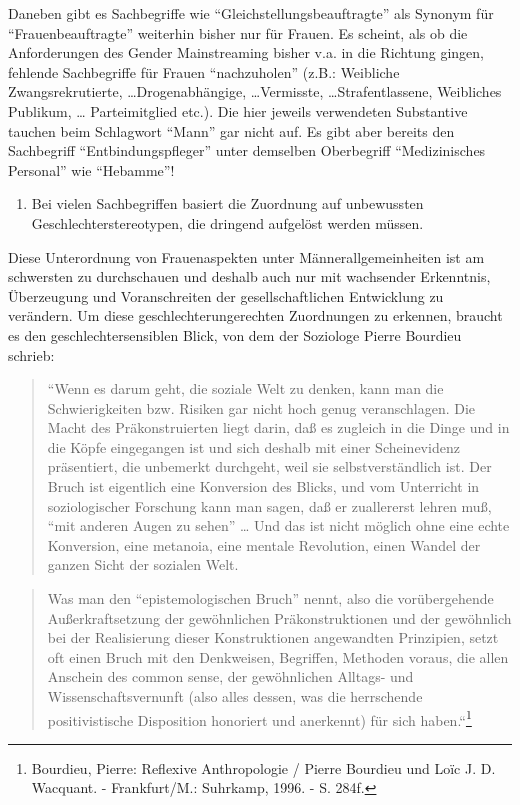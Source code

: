\documentclass[a4paper,
fontsize=11pt,
oneside,
numbers=noperiodatend,
parskip=half-,
bibliography=totoc,
final
]{scrartcl}
\begin{document}
Daneben gibt es Sachbegriffe wie \enquote{Gleichstellungsbeauftragte}
als Synonym für \enquote{Frauenbeauftragte} weiterhin bisher nur für
Frauen. Es scheint, als ob die Anforderungen des Gender Mainstreaming
bisher v.a. in die Richtung gingen, fehlende Sachbegriffe für Frauen
\enquote{nachzuholen} (z.B.: Weibliche Zwangsrekrutierte,
\ldots{}Drogenabhängige, \ldots{}Vermisste, \ldots{}Strafentlassene,
Weibliches Publikum, \ldots{} Parteimitglied etc.). Die hier jeweils
verwendeten Substantive tauchen beim Schlagwort \enquote{Mann} gar nicht
auf. Es gibt aber bereits den Sachbegriff \enquote{Entbindungspfleger}
unter demselben Oberbegriff \enquote{Medizinisches Personal} wie
\enquote{Hebamme}!

\begin{enumerate}
\def\labelenumi{\arabic{enumi}.}
\setcounter{enumi}{2}
\itemsep1pt\parskip0pt
\item
  Bei vielen Sachbegriffen basiert die Zuordnung auf unbewussten
  Geschlechterstereotypen, die dringend aufgelöst werden müssen.
\end{enumerate}

Diese Unterordnung von Frauenaspekten unter Männerallgemeinheiten ist am
schwersten zu durchschauen und deshalb auch nur mit wachsender
Erkenntnis, Überzeugung und Voranschreiten der gesellschaftlichen
Entwicklung zu verändern. Um diese geschlechterungerechten Zuordnungen
zu erkennen, braucht es den geschlechtersensiblen Blick, von dem der
Soziologe Pierre Bourdieu schrieb:

\begin{quote}
``Wenn es darum geht, die soziale Welt zu denken, kann man die
Schwierigkeiten bzw. Risiken gar nicht hoch genug veranschlagen. Die
Macht des Präkonstruierten liegt darin, daß es zugleich in die Dinge und
in die Köpfe eingegangen ist und sich deshalb mit einer Scheinevidenz
präsentiert, die unbemerkt durchgeht, weil sie selbstverständlich ist.
Der Bruch ist eigentlich eine Konversion des Blicks, und vom Unterricht
in soziologischer Forschung kann man sagen, daß er zuallererst lehren
muß, \enquote{mit anderen Augen zu sehen} \ldots{} Und das ist nicht
möglich ohne eine echte Konversion, eine metanoia, eine mentale
Revolution, einen Wandel der ganzen Sicht der sozialen Welt.
\end{quote}

\begin{quote}
Was man den \enquote{epistemologischen Bruch} nennt, also die
vorübergehende Außerkraftsetzung der gewöhnlichen Präkonstruktionen und
der gewöhnlich bei der Realisierung dieser Konstruktionen angewandten
Prinzipien, setzt oft einen Bruch mit den Denkweisen, Begriffen,
Methoden voraus, die allen Anschein des common sense, der gewöhnlichen
Alltags- und Wissenschaftsvernunft (also alles dessen, was die
herrschende positivistische Disposition honoriert und anerkennt) für
sich haben.``\footnote{Bourdieu, Pierre: Reflexive Anthropologie /
  Pierre Bourdieu und Loïc J. D. Wacquant. - Frankfurt/M.: Suhrkamp,
  1996. - S. 284f.}
\end{quote}
\end{document}
